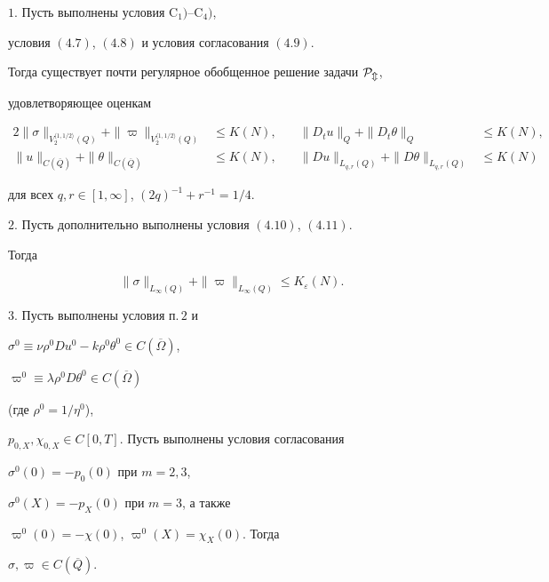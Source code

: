 \begin{thms} $1.$ Пусть выполнены условия $\mathrm C_1)$--$\mathrm C_4)$,


условия $(4.7)$, $(4.8)$ и условия согласования $(4.9)$.


Тогда существует почти регулярное обобщенное решение задачи $\cal P_m$,


удовлетворяющее оценкам


\begin{alignat*}{2}


\|\sigma\|_{V_2^{\langle1,1/2\rangle}(Q)}+


\|\varpi\|_{V_2^{\langle1,1/2\rangle}(Q)} &\le K(N),&\quad


\|D_tu\|_Q+\|D_t\theta\|_Q&\le K(N), \\


\|u\|_{C(\overline Q)}+\|\theta\|_{C(\overline Q)}&\le K(N),&\quad


\|Du\|_{L_{q,r}(Q)}+\|D\theta\|_{L_{q,r}(Q)}&\le K(N)


\end{alignat*}


для всех $q,r\in [1,\infty]$, $(2q)^{-1}+r^{-1}=1/4$.





$2.$ Пусть дополнительно выполнены условия $(4.10)$, $(4.11)$.


Тогда


$$


\|\sigma\|_{L_{\infty}(Q)}+\|\varpi\|_{L_{\infty}(Q)}\le K_{\varepsilon}(N).


$$





$3.$ Пусть выполнены условия п.\,$2$ и


$\sigma^0\equiv\nu\rho^0Du^0-k\rho^0\theta^0\in C(\overline\Omega)$,


$\varpi^0\equiv\lambda\rho^0D\theta^0\in C(\overline\Omega)$


(где $\rho^0=1/\eta^0$),


$p_{0,X},\chi_{0,X}\in C[0,T]$. Пусть выполнены условия согласования


$\sigma^0(0)=-p_0(0)$ при $m=2,3$,


$\sigma^0(X)=-p_X(0)$ при $m=3$, а также


$\varpi^0(0)=-\chi(0)$, $\varpi^0(X)=\chi_X(0)$. Тогда


$\sigma,\varpi\in C(\overline Q)$.


\end{thms}





